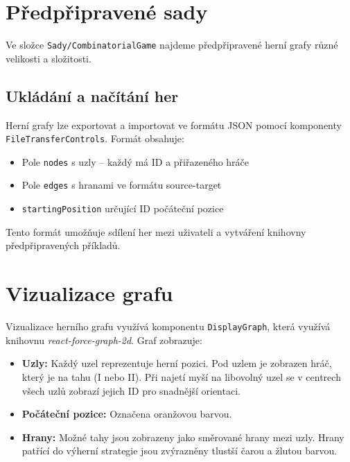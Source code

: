 \section{Předpřipravené sady}
\label{sec:GamesPreparedSets}

Ve složce \texttt{Sady/CombinatorialGame} najdeme předpřipravené herní grafy různé velikosti a složitosti.

\subsection{Ukládání a načítání her}
\label{sec:GamesSerialization}

Herní grafy lze exportovat a importovat ve formátu JSON pomocí komponenty \texttt{FileTransferControls}. Formát obsahuje:

\begin{itemize}
    \item Pole \texttt{nodes} s uzly – každý má ID a přiřazeného hráče
    \item Pole \texttt{edges} s hranami ve formátu source-target
    \item \texttt{startingPosition} určující ID počáteční pozice
\end{itemize}

Tento formát umožňuje sdílení her mezi uživateli a vytváření knihovny předpřipravených příkladů.

\section{Vizualizace grafu}
\label{sec:GamesVisualization}

Vizualizace herního grafu využívá komponentu \texttt{DisplayGraph}, která využívá knihovnu \emph{react-force-graph-2d}. Graf zobrazuje:

\begin{itemize}
    \item \textbf{Uzly:} Každý uzel reprezentuje herní pozici. Pod uzlem je zobrazen hráč, který je na tahu (I nebo II). Při najetí myší na libovolný uzel se v centrech všech uzlů zobrazí jejich ID pro snadnější orientaci.
    
    \item \textbf{Počáteční pozice:} Označena oranžovou barvou.
    
    \item \textbf{Hrany:} Možné tahy jsou zobrazeny jako směrované hrany mezi uzly. Hrany patřící do výherní strategie jsou zvýrazněny tlustší čarou a žlutou barvou.
\end{itemize}

